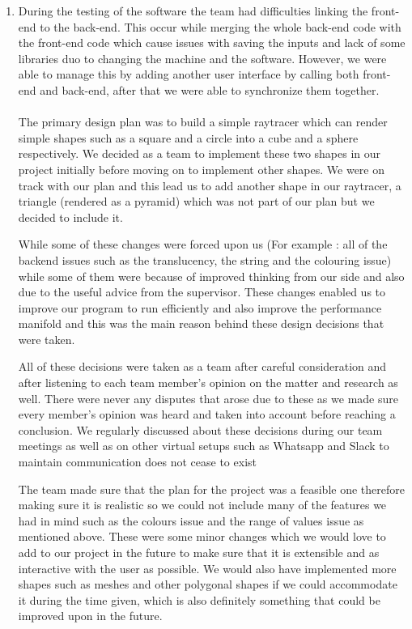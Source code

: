 \documentclass{article}
\begin{document}
\begin{enumerate}
\item During the testing of the software the team had difficulties linking the front-end to the back-end. This occur while merging the whole back-end code with the front-end code which cause issues with saving the inputs and lack of some libraries duo to changing the machine and the software. However, we were able to manage this by adding another user interface by calling both front-end and back-end, after that we were able to synchronize them together.

\paragraph{} The primary design plan was to build a simple raytracer which can render simple shapes such as a square and a circle into a cube and a sphere respectively. We decided as a team to implement these two shapes in our project initially before moving on to implement other shapes. We were on track with our plan and this lead us to add another shape in our raytracer, a triangle (rendered as a pyramid) which was not part of our plan but we decided to include it. 

While some of these changes were forced upon us (For example : all of the backend issues such as the translucency, the string and the colouring issue) while some of them were because of improved thinking from our side and also due to the useful advice from the supervisor. These changes enabled us to improve our program to run efficiently and also improve the performance manifold and this was the main reason behind these design decisions that were taken. 

All of these decisions were taken as a team after careful consideration and after listening to each team member’s opinion on the matter and research as well. There were never any disputes that arose due to these as we made sure every member’s opinion was heard and taken into account before reaching a conclusion. We regularly discussed about these decisions during our team meetings as well as on other virtual setups such as Whatsapp and Slack to maintain communication does not cease to exist 

The team made sure that the plan for the project was a feasible one therefore making sure it is realistic so we could not include many of the features we had in mind such as the colours issue and the range of values issue as mentioned above. These were some minor changes which we would love to add to our project in the future to make sure that it is extensible and as interactive with the user as possible. We would also have implemented more shapes such as meshes and other polygonal shapes if we could accommodate it during the time given, which is also definitely something that could be improved upon in the future.

\end{enumerate}
\newpage
\end{document}
